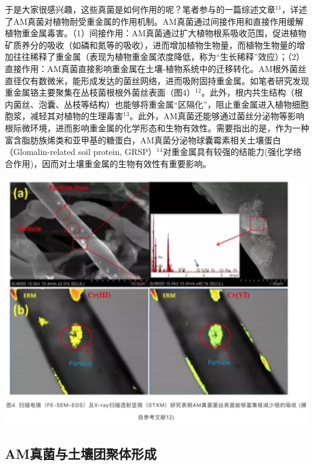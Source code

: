 \documentclass[
]{book}
\begin{document}
于是大家很感兴趣，这些真菌是如何作用的呢？笔者参与的一篇综述文章\(^{11}\)，详述了AM真菌对植物耐受重金属的作用机制。AM真菌通过间接作用和直接作用缓解植物重金属毒害。（1）间接作用：AM真菌通过扩大植物根系吸收范围，促进植物矿质养分的吸收（如磷和氮等的吸收），进而增加植物生物量，而植物生物量的增加往往稀释了重金属（表现为植物重金属浓度降低，称为``生长稀释''效应）；（2）直接作用：AM真菌直接影响重金属在土壤-植物系统中的迁移转化。AM根外菌丝直径仅有数微米，能形成发达的菌丝网络，进而吸附固持重金属。如笔者研究发现重金属铬主要聚集在丛枝菌根根外菌丝表面（图4）\(^{12}\)。此外，根内共生结构（根内菌丝、泡囊、丛枝等结构）也能够将重金属``区隔化''，阻止重金属进入植物细胞胞浆，减轻其对植物的生理毒害\(^{13}\)。此外，AM真菌还能够通过菌丝分泌物等影响根际微环境，进而影响重金属的化学形态和生物有效性。需要指出的是，作为一种富含脂肪族烯类和亚甲基的糖蛋白，AM真菌分泌物球囊霉素相关土壤蛋白（Glomalin-related soil protein, GRSP）\(^{14}\)对重金属具有较强的结能力(强化学络合作用)，因而对土壤重金属的生物有效性有重要影响。

\includegraphics[width=6.67in]{images/am4}

\hypertarget{amux771fux83ccux4e0eux571fux58e4ux56e2ux805aux4f53ux5f62ux6210}{%
\subsection{AM真菌与土壤团聚体形成}\label{amux771fux83ccux4e0eux571fux58e4ux56e2ux805aux4f53ux5f62ux6210}}
\end{document}
